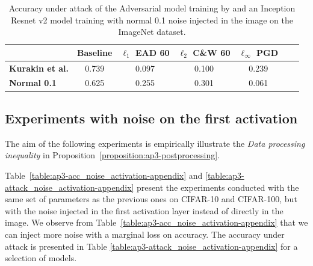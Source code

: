 \begin{table}[htb]
  \centering
  \caption{Accuracy under attack of the Adversarial model training by \citet{kurakin2016adversarial} and an Inception Resnet v2 model training with normal 0.1 noise injected in the image on the ImageNet dataset.}
  \label{table:ap3-adv_imagenet-appendix}
  \centering
  \begin{tabular}{lcccccc}
    \toprule
      & \textbf{Baseline} & \textbf{$\ell_1$ EAD 60} & \textbf{$\ell_2$ C\&W 60} & \textbf{$\ell_\infty$ PGD} \\
    \midrule
    \textbf{Kurakin et al. \cite{kurakin2016adversarial}} & 0.739 & 0.097 & 0.100 & 0.239 \\
    \textbf{Normal 0.1} & 0.625 & 0.255 & 0.301 & 0.061 \\
    \bottomrule
  \end{tabular}
\end{table}

\subsection{Experiments with noise on the first activation}

The aim of the following experiments is empirically illustrate the \textit{Data processing inequality} in Proposition~\ref{proposition:ap3-postprocessing}.

Table~\ref{table:ap3-acc_noise_activation-appendix} and \ref{table:ap3-attack_noise_activation-appendix} present the experiments conducted with the same set of parameters as the previous ones  on CIFAR-10 and CIFAR-100, but with the noise injected in the first activation layer instead of directly in the image. We observe from  Table~\ref{table:ap3-acc_noise_activation-appendix} that we can inject more noise with a marginal loss on accuracy. The accuracy under attack is presented in Table \ref{table:ap3-attack_noise_activation-appendix} for a selection of models. 

